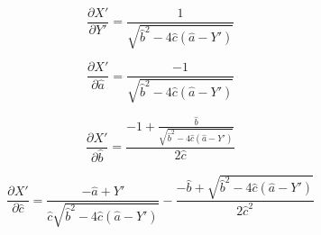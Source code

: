 \documentclass[12pt]{article}
\begin{document}
\pagestyle{empty}
\Large
{}
\pagecolor{ehandbook}


\[
\frac{\partial{X'}}{\partial{Y'}} = 
\frac{1}{\sqrt{\hat{b}^{2} - 4\hat{c}(\hat{a}-Y')}}
\]

\[
\frac{\partial{X'}}{\partial{\hat{a}}} =
     \frac{-1}{\sqrt{\hat{b}^{2} - 4\hat{c}(\hat{a}-Y')}}
\]


\[
\frac{\partial{X'}}{\partial{\hat{b}}} =
\frac{-1 + \frac{\hat{b}}{\sqrt{\hat{b}^{2} - 4\hat{c}(\hat{a}-Y')}}}{2\hat{c}}
\]


\[
\frac{\partial{X'}}{\partial{\hat{c}}} =
\frac{-\hat{a} + Y'}{\hat{c}\sqrt{\hat{b}^{2} - 4\hat{c}(\hat{a}-Y')}} - 
\frac{-\hat{b} + \sqrt{\hat{b}^{2} - 4\hat{c}(\hat{a}-Y')}}{2\hat{c}^{2}}
\]
\end{document}
